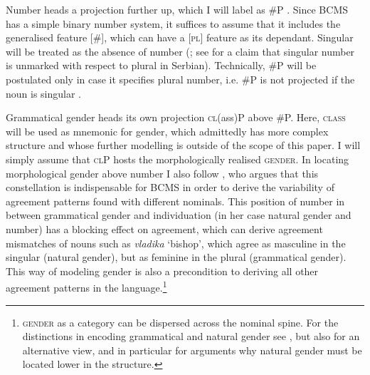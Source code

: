 \documentclass[output=paper,colorlinks,citecolor=brown]{langscibook}
\begin{document}
Number heads a projection further up, which I will label as \#P \citep{picallo91,bernstein-thesis,borer05vol1,acquaviva09,harbour08}. 
Since BCMS has a simple binary number system, it suffices to assume that it includes the generalised feature [\#], which can have a [\textsc{pl}] feature as its dependant. Singular will be treated as the absence of number (\citealt{pus:nevins2011,pesetsky14}; see \citealt{despic-hybrid} for a claim that singular number is unmarked with respect to plural in Serbian). Technically, \#P will be postulated only in case it specifies plural number, i.e. \#P is not projected if the noun is singular \citep{kratzer07}.

Grammatical gender heads its own projection \textsc{cl}(ass)P above \#P. Here, \textsc{class} will be used as mnemonic for gender, which admittedly has more complex structure and whose further modelling is outside of the scope of this paper. I will simply assume that \textsc{cl}P hosts the morphologically realised \textsc{gender}. In locating morphological gender above number I also follow \citet{puskarsyntax,puskarglossapredicate}, who argues that this constellation is indispensable for BCMS in order to derive the variability of agreement patterns found with different nominals. This position of number in between grammatical gender and individuation (in her case natural gender and number) has a blocking effect on agreement, which can derive agreement mismatches of nouns such as \textit{vladika} `bishop', which agree as masculine in the singular (natural gender), but as feminine in the plural (grammatical gender). This way of modeling gender is also a precondition to deriving all other agreement patterns in the language.\footnote{\textsc{gender} as a category can be dispersed across the nominal spine. For the distinctions in encoding grammatical and natural gender see \citet{steriopolowiltschko,pesetsky14,landau15,kucerova17,steriopolo18russianhybrid,steriopolo18Russian,fassifehri18}, but also \citet{arsenijevic21} for an alternative view, and in particular \citet{puskarsyntax,puskarglossapredicate} for arguments why natural gender must be located lower in the structure.}
	
\end{document}
